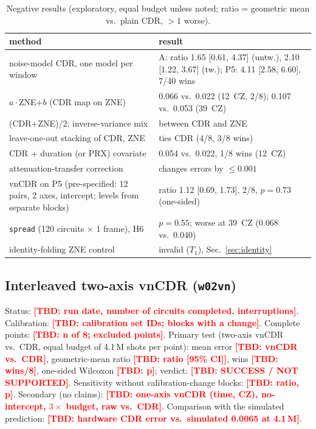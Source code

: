 \documentclass[conference]{IEEEtran}
\newcommand{\TBD}[1]{\textcolor{red}{\textbf{[TBD: #1]}}}
\newcommand{\arm}[1]{\texttt{#1}}
\begin{document}
\begin{table}[t]
\caption{Negative results (exploratory, equal budget unless noted; ratio = geometric mean
vs.\ plain CDR, $>1$ worse).}
\label{tab:neg}
\centering\footnotesize
\setlength{\tabcolsep}{3pt}
\begin{tabular}{@{}L{0.42\columnwidth}L{0.54\columnwidth}@{}}
\toprule
method & result \\
\midrule
noise-model CDR, one model per window & A: ratio 1.65 [0.61, 4.37] (untw.), 2.10 [1.22, 3.67] (tw.); P5: 4.11 [2.58, 6.60], 7/40 wins \\
$a\cdot$ZNE$+b$ (CDR map on ZNE) & 0.066 vs.\ 0.022 (12~CZ, 2/8); 0.107 vs.\ 0.053 (39~CZ) \\
(CDR+ZNE)/2; inverse-variance mix & between CDR and ZNE \\
leave-one-out stacking of CDR, ZNE & ties CDR (4/8, 3/8 wins) \\
CDR + duration (or PRX) covariate & 0.054 vs.\ 0.022, 1/8 wins (12~CZ) \\
attenuation-transfer correction & changes errors by $\le0.001$ \\
vnCDR on P5 (pre-specified: 12 pairs, 2 axes, intercept; levels from separate blocks) & ratio 1.12 [0.69, 1.73], 2/8, $p=0.73$ (one-sided) \\
\arm{spread} (120 circuits $\times$ 1 frame), H6 & $p=0.55$; worse at 39~CZ (0.068 vs.\ 0.040) \\
identity-folding ZNE control & invalid ($T_1$), Sec.~\ref{sec:identity} \\
\bottomrule
\end{tabular}
\end{table}

\subsection{Interleaved two-axis vnCDR (\texttt{w02vn})}\label{sec:w02vn}
Status: \TBD{run date, number of circuits completed, interruptions}. Calibration: \TBD{calibration
set IDs; blocks with a change}. Complete points: \TBD{n of 8; excluded points}. Primary test
(two-axis vnCDR vs.\ CDR, equal budget of 4.1\,M shots per point): mean error \TBD{vnCDR vs.\
CDR}, geometric-mean ratio \TBD{ratio [95\% CI]}, wins \TBD{wins/8}, one-sided Wilcoxon
\TBD{p}; verdict: \TBD{SUCCESS / NOT SUPPORTED}. Sensitivity without calibration-change blocks:
\TBD{ratio, p}. Secondary (no claims): \TBD{one-axis vnCDR (time, CZ), no-intercept, $3\times$
budget, raw vs.\ CDR}. Comparison with the simulated prediction: \TBD{hardware CDR error vs.\
simulated 0.0065 at 4.1\,M}.
\end{document}
